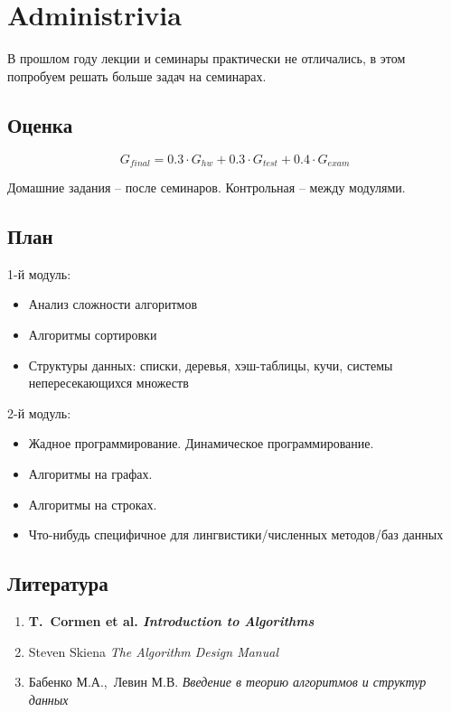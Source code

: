 \documentclass[12pt,a4paper]{report}
\begin{document}

\section{Administrivia}

В прошлом году лекции и семинары практически не отличались, в этом попробуем решать больше задач на семинарах.

\subsection*{Оценка}

$$
G_{final} = 0.3 \cdot G_{hw} + 0.3 \cdot G_{test} + 0.4 \cdot G_{exam}
$$

Домашние задания -- после семинаров. Контрольная -- между модулями.

\subsection*{План}

1-й модуль:

\begin{itemize}
  \item Анализ сложности алгоритмов
  \item Алгоритмы сортировки
  \item Структуры данных: списки, деревья, хэш-таблицы, кучи, системы непересекающихся множеств
\end{itemize}

2-й модуль:

\begin{itemize}
  \item Жадное программирование. Динамическое программирование.
  \item Алгоритмы на графах.
  \item Алгоритмы на строках.
  \item Что-нибудь специфичное для лингвистики/численных методов/баз данных
\end{itemize}

\subsection*{Литература}

\begin{enumerate}
  \item {\bf T.~Cormen et al. {\em Introduction to Algorithms}}
  \item Steven Skiena {\em The Algorithm Design Manual}
  \item Бабенко М.А.,~Левин М.В. {\em Введение в теорию алгоритмов и структур данных}
\end{enumerate}
\end{document}
